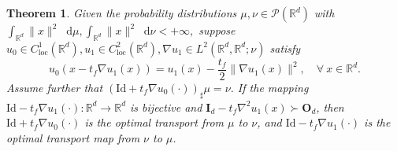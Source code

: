 \documentclass{article} %
\theoremstyle{plain}
\newtheorem{theorem}{Theorem}[section]
\theoremstyle{definition}
\theoremstyle{remark}
\newcommand*\diff{\mathop{}\!\mathrm{d}}
\begin{document}
\begin{theorem}\label{thm:main}
  Given the probability distributions $\mu, \nu \in \mathscr{P}(\mathbb{R}^d)$ with $\int_{\mathbb{R}^d}\|x\|^2\diff \mu, \int_{\mathbb{R}^d}\|x\|^2\diff \nu < +\infty,$ 
  suppose $u_0 \in C^1_{\text{loc}}(\mathbb{R}^d), u_1 \in C^2_{\text{loc}}(\mathbb{R}^d), \nabla u_1 \in L^2(\mathbb{R}^d, \mathbb{R}^d; \nu)$ satisfy
  \begin{equation}
    u_0(x-t_f\nabla u_1(x)) = u_1(x) - \frac{t_f}{2}\|\nabla u_1(x)\|^2, \quad \forall \ x\in\mathbb{R}^d.  \label{implicit_equ_at_T}
  \end{equation}
  Assume further that $(\mathrm{Id} + t_f\nabla u_0(\cdot))_\sharp\mu = \nu$. If the mapping $\mathrm{Id} - t_f\nabla u_1(\cdot):\mathbb{R}^d \rightarrow \mathbb{R}^d$ is bijective and $\textbf{I}_d - t_f\nabla^2 u_1(x)\succ \textbf{O}_d$, then $\mathrm{Id} + t_f \nabla u_0(\cdot)$ is the optimal transport from $\mu$ to $\nu$, and $\mathrm{Id} - t_f \nabla u_1(\cdot)$ is the optimal transport map from $\nu$ to $\mu$.
\end{theorem}
\end{document}
